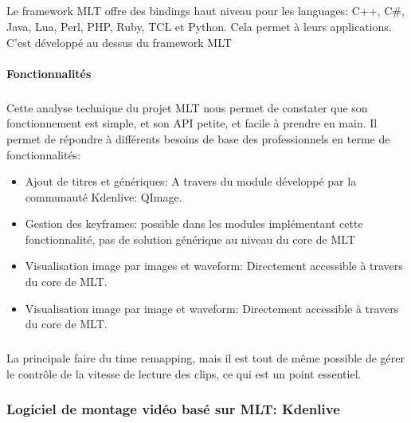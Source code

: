 {\subparagraph{}

Le framework MLT offre des bindings haut niveau pour les languages:
C++, C\#, Java, Lua, Perl, PHP, Ruby, TCL et Python. Cela permet à
leurs applications. C'est %
développé au dessus du framework MLT

\paragraph{Fonctionnalités}

\subparagraph{ }

Cette analyse technique du projet MLT nous permet de constater que
son fonctionnement est simple, et son API petite, et facile à prendre
en main.  Il permet de répondre à différents besoins de base  des
professionnels en terme de fonctionnalités:

\begin{itemize}

  \item {Ajout de titres et génériques: A travers du module développé
  par la
    communauté Kdenlive: QImage.}

  \item {Gestion des keyframes: possible dans les modules implémentant
    cette fonctionnalité, pas de solution générique au niveau du
    core de MLT}

  \item {Visualisation image par images et waveform: Directement
  accessible à
    travers du core de MLT.}

  \item {Visualisation image par image et waveform: Directement
  accessible à
    travers du core de MLT.}

\end{itemize}

\subparagraph{}

La principale %
faire du time remapping, mais il est tout de même possible de gérer le
contrôle de la vitesse de lecture des clips, ce qui est un point essentiel.

\subsubsection {Logiciel de montage vidéo basé sur MLT: Kdenlive}

\subparagraph{}

}
